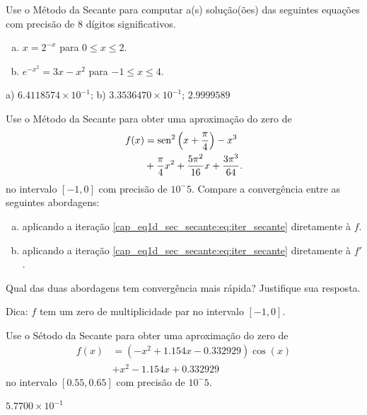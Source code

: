 \begin{exer}
  Use o Método da Secante para computar a(s) solução(ões) das seguintes equações com precisão de 8 dígitos significativos.
  \begin{enumerate}[a)]
  \item $x = 2^{-x}$ para $0\leq x \leq 2$.
  \item $e^{-x^2} = 3x - x^2$ para $-1\leq x\leq 4$.
  \end{enumerate}
\end{exer}
\begin{resp}
  a) $6.4118574\times 10^{-1}$; b) $3.3536470\times 10^{-1}$; $2.9999589$
\end{resp}

\begin{exer}
  Use o Método da Secante para obter uma aproximação do zero de
  \begin{equation}
    \begin{aligned}
      f(x) &= \operatorname{sen}^2\left(x+\frac{\pi}{4}\right) - x^3 \\
           &+ \frac{\pi}{4}x^2 + \frac{5\pi^2}{16}x + \frac{3\pi^3}{64}.
    \end{aligned}
\end{equation}
  no intervalo $[-1, 0]$ com precisão de $10^-5$. Compare a convergência entre as seguintes abordagens:
  \begin{enumerate}[a)]
  \item aplicando a iteração \eqref{cap_eq1d_sec_secante:eq:iter_secante} diretamente à $f$.
  \item aplicando a iteração \eqref{cap_eq1d_sec_secante:eq:iter_secante} diretamente à $f'$.
  \end{enumerate}
  Qual das duas abordagens tem convergência mais rápida? Justifique sua resposta.
\end{exer}
\begin{resp}
  Dica: $f$ tem um zero de multiplicidade par no intervalo $[-1, 0]$.
\end{resp}

\begin{exer}
  Use o Sétodo da Secante para obter uma aproximação do zero de
  \begin{equation}
    \begin{aligned}
      f(x) &= (-x^2+1.154x-0.332929)\cos(x) \\
           &+ x^2 - 1.154x + 0.332929
    \end{aligned}
\end{equation}
no intervalo $[0.55, 0.65]$ com precisão de $10^-5$.
\end{exer}
\begin{resp}
  $5.7700\times 10^{-1}$
\end{resp}

